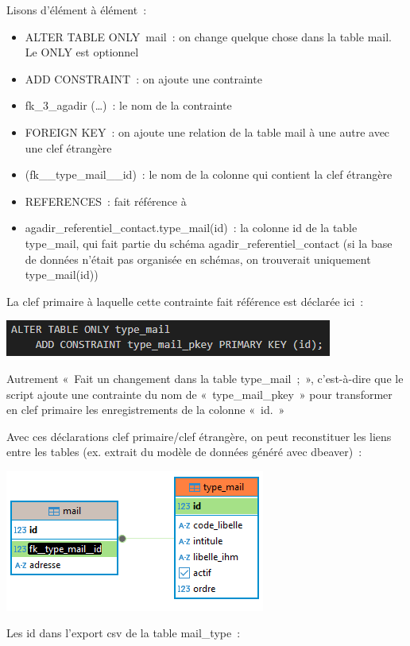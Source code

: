 Lisons d'élément à élément~:

\begin{itemize}
	\item
	ALTER TABLE ONLY~mail~: on change quelque chose dans la table mail. Le
	ONLY est optionnel
	\item
	ADD CONSTRAINT~: on ajoute une contrainte
	\item
	fk\_3\_agadir (\ldots)~: le nom de la contrainte
	\item
	FOREIGN KEY~: on ajoute une relation de la table mail à une autre avec
	une clef étrangère
	\item
	(fk\_\_type\_mail\_\_id)~: le nom de la colonne qui contient la clef
	étrangère
	\item
	REFERENCES~: fait référence à
	\item
	agadir\_referentiel\_contact.type\_mail(id)~: la colonne id de la
	table type\_mail, qui fait partie du schéma
	agadir\_referentiel\_contact (si la base de données n'était pas
	organisée en schémas, on trouverait uniquement type\_mail(id))
\end{itemize}

La clef primaire à laquelle cette contrainte fait référence est déclarée
ici~:

\includegraphics{annexes/image9.png}

Autrement «~Fait un changement dans la table type\_mail~;~»,
c'est-à-dire que le script ajoute une contrainte du nom de
«~type\_mail\_pkey~» pour transformer en clef primaire les
enregistrements de la colonne «~id.~»

Avec ces déclarations clef primaire/clef étrangère, on peut reconstituer
les liens entre les tables (ex. extrait du modèle de données généré avec
dbeaver)~:

\includegraphics{annexes/image10.png}

Les id dans l'export csv de la table mail\_type~:

